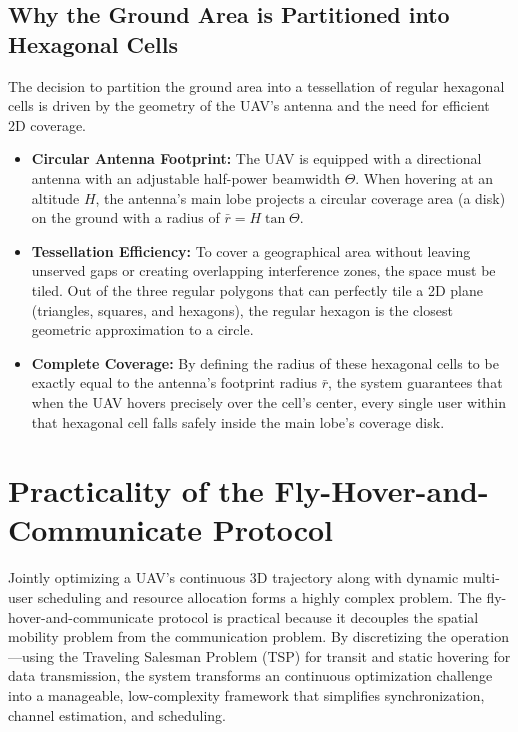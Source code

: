 \documentclass[11pt,a4paper]{article}
\begin{document}
    \subsection{Why the Ground Area is Partitioned into Hexagonal Cells}
    The decision to partition the ground area into a tessellation of regular hexagonal cells is driven by the geometry of the UAV's antenna and the need for efficient 2D coverage.

    \begin{itemize}
        \item \textbf{Circular Antenna Footprint:} The UAV is equipped with a directional antenna with an adjustable half-power beamwidth $\Theta$.
        When hovering at an altitude $H$, the antenna's main lobe projects a circular coverage area (a disk) on the ground with a radius of $\bar{r} = H \tan\Theta$.
        \item \textbf{Tessellation Efficiency:} To cover a geographical area without leaving unserved gaps or creating overlapping interference zones, the space must be tiled.
        Out of the three regular polygons that can perfectly tile a 2D plane (triangles, squares, and hexagons), the regular hexagon is the closest geometric approximation to a circle.
        \item \textbf{Complete Coverage:} By defining the radius of these hexagonal cells to be exactly equal to the antenna's footprint radius $\bar{r}$,
        the system guarantees that when the UAV hovers precisely over the cell's center, every single user within that hexagonal cell falls safely inside the main lobe's coverage disk.
    \end{itemize}

\section{Practicality of the Fly-Hover-and-Communicate Protocol}
Jointly optimizing a UAV’s continuous 3D trajectory along with dynamic multi-user scheduling and resource allocation forms a highly complex problem.
The fly-hover-and-communicate protocol is practical because it decouples the spatial mobility problem from the communication problem.
By discretizing the operation—using the Traveling Salesman Problem (TSP) for transit and static hovering for data transmission,
the system transforms an continuous optimization challenge into a manageable, low-complexity framework that simplifies synchronization, channel estimation, and scheduling.
\end{document}
